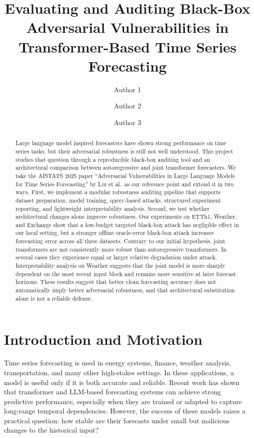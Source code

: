 \documentclass[11pt]{article}
\title{Evaluating and Auditing Black-Box Adversarial Vulnerabilities in Transformer-Based Time Series Forecasting}
\author{Author 1 \and Author 2 \and Author 3}
\date{}
\begin{document}
\maketitle

\begin{abstract}
Large language model inspired forecasters have shown strong performance on time series tasks, but their adversarial robustness is still not well understood. This project studies that question through a reproducible black-box auditing tool and an architectural comparison between autoregressive and joint transformer forecasters. We take the AISTATS 2025 paper ``Adversarial Vulnerabilities in Large Language Models for Time Series Forecasting'' by Liu et al.\ as our reference point and extend it in two ways. First, we implement a modular robustness auditing pipeline that supports dataset preparation, model training, query-based attacks, structured experiment reporting, and lightweight interpretability analysis. Second, we test whether architectural changes alone improve robustness. Our experiments on ETTh1, Weather, and Exchange show that a low-budget targeted black-box attack has negligible effect in our local setting, but a stronger offline oracle-error black-box attack increases forecasting error across all three datasets. Contrary to our initial hypothesis, joint transformers are not consistently more robust than autoregressive transformers. In several cases they experience equal or larger relative degradation under attack. Interpretability analysis on Weather suggests that the joint model is more sharply dependent on the most recent input block and remains more sensitive at later forecast horizons. These results suggest that better clean forecasting accuracy does not automatically imply better adversarial robustness, and that architectural substitution alone is not a reliable defense.
\end{abstract}

\section{Introduction and Motivation}
Time series forecasting is used in energy systems, finance, weather analysis, transportation, and many other high-stakes settings. In these applications, a model is useful only if it is both accurate and reliable. Recent work has shown that transformer and LLM-based forecasting systems can achieve strong predictive performance, especially when they are trained or adapted to capture long-range temporal dependencies. However, the success of these models raises a practical question: how stable are their forecasts under small but malicious changes to the historical input?
\end{document}
